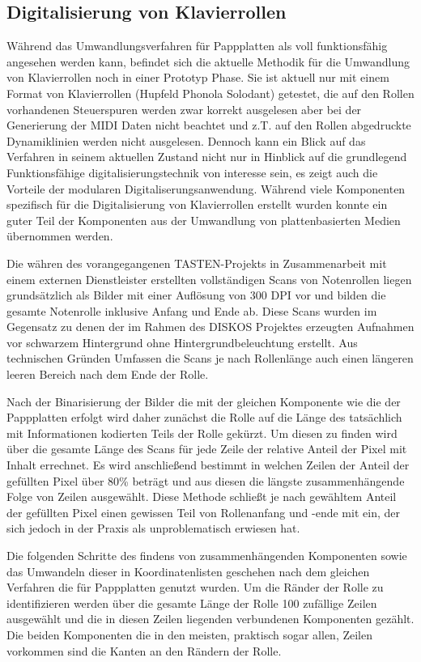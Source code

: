 \subsection{Digitalisierung von Klavierrollen}

Während das Umwandlungsverfahren für Pappplatten als voll funktionsfähig angesehen werden kann, befindet sich die aktuelle Methodik für die Umwandlung von Klavierrollen noch in einer Prototyp Phase.
Sie ist aktuell nur mit einem Format von Klavierrollen (Hupfeld Phonola Solodant) getestet, die auf den Rollen vorhandenen Steuerspuren werden zwar korrekt ausgelesen aber bei der Generierung der MIDI Daten nicht beachtet und z.T. auf den Rollen abgedruckte Dynamiklinien werden nicht ausgelesen.
Dennoch kann ein Blick auf das Verfahren in seinem aktuellen Zustand nicht nur in Hinblick auf die grundlegend Funktionsfähige digitalisierungstechnik von interesse sein, es zeigt auch die Vorteile der modularen Digitaliserungsanwendung.
Während viele Komponenten spezifisch für die Digitalisierung von Klavierrollen erstellt wurden konnte ein guter Teil der Komponenten aus der Umwandlung von plattenbasierten Medien übernommen werden.

Die währen des vorangegangenen TASTEN-Projekts in Zusammenarbeit mit einem externen Dienstleister erstellten vollständigen Scans von Notenrollen liegen grundsätzlich als Bilder mit einer Auflösung von 300 DPI vor und bilden die gesamte Notenrolle inklusive Anfang und Ende ab.
Diese Scans wurden im Gegensatz zu denen der im Rahmen des DISKOS Projektes erzeugten Aufnahmen vor schwarzem Hintergrund ohne Hintergrundbeleuchtung erstellt.
Aus technischen Gründen Umfassen die Scans je nach Rollenlänge auch einen längeren leeren Bereich nach dem Ende der Rolle.

Nach der Binarisierung der Bilder die mit der gleichen Komponente wie die der Pappplatten erfolgt wird daher zunächst die Rolle auf die Länge des tatsächlich mit Informationen kodierten Teils der Rolle gekürzt.
Um diesen zu finden wird über die gesamte Länge des Scans für jede Zeile der relative Anteil der Pixel mit Inhalt errechnet.
Es wird anschließend bestimmt in welchen Zeilen der Anteil der gefüllten Pixel über 80\% beträgt und aus diesen die längste zusammenhängende Folge von Zeilen ausgewählt.
Diese Methode schließt je nach gewähltem Anteil der gefüllten Pixel einen gewissen Teil von Rollenanfang und -ende mit ein, der sich jedoch in der Praxis als unproblematisch erwiesen hat.

Die folgenden Schritte des findens von zusammenhängenden Komponenten sowie das Umwandeln dieser in Koordinatenlisten geschehen nach dem gleichen Verfahren die für Pappplatten genutzt wurden.
Um die Ränder der Rolle zu identifizieren werden über die gesamte Länge der Rolle 100 zufällige Zeilen ausgewählt und die in diesen Zeilen liegenden verbundenen Komponenten gezählt.
Die beiden Komponenten die in den meisten, praktisch sogar allen, Zeilen vorkommen sind die Kanten an den Rändern der Rolle.

